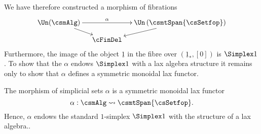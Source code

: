 \documentclass[a4paper]{article}
\numberwithin{equation}{section}
\begin{document}
We have therefore constructed a morphism of fibrations
\begin{equation*}
 \xymatrixrowsep{.8pc}\xymatrixcolsep{.9pc}\xymatrix{\Un(\csmAlg)\ar[rr]^-{\alpha} \ar[rd] & & \Un\left(\csmtSpan{\csSetfop}\right)\ar[ld] \\
  & \cFinDel & }
\end{equation*}
Furthermore, the image of the object $\underline{1}$ in the fibre over $(\underline{1}_*, [0])$ is $\Simplex 1$. To show that the $\alpha$ endows $\Simplex 1$ with a lax algebra structure it remains only to show that $\alpha$ defines a symmetric monoidal lax functor.

\begin{prop}
 \label{PropCombAlg}
 The morphism of simplicial sets $\alpha$ is a symmetric monoidal lax functor 
 \begin{equation*}
 \alpha:\csmAlg \rightsquigarrow \csmtSpan{\csSetfop}.
 \end{equation*}
 Hence, $\alpha$ endows the standard $1$-simplex $\Simplex 1$ with the structure of a lax algebra..
\end{prop}
\end{document}
